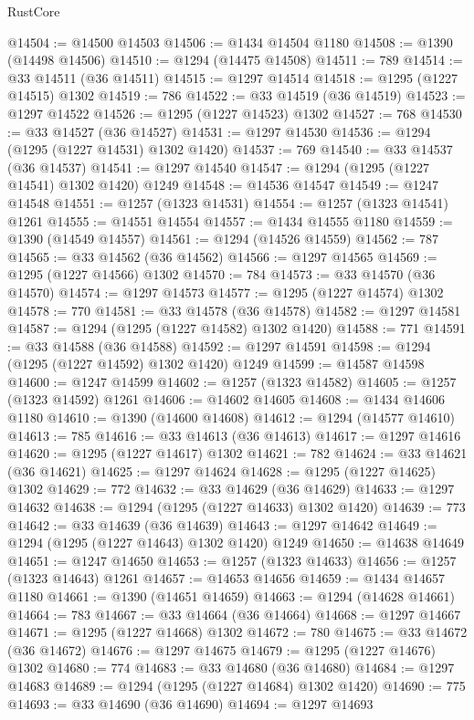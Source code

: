 \begin{lexlean}{RustCore}
\begin{coremodule}
@14504 := @14500 @14503
@14506 := @1434 @14504 @1180
@14508 := @1390 (@14498 @14506)
@14510 := @1294 (@14475 @14508)
@14511 := 789
@14514 := @33 @14511 (@36 @14511)
@14515 := @1297 @14514
@14518 := @1295 (@1227 @14515) @1302
@14519 := 786
@14522 := @33 @14519 (@36 @14519)
@14523 := @1297 @14522
@14526 := @1295 (@1227 @14523) @1302
@14527 := 768
@14530 := @33 @14527 (@36 @14527)
@14531 := @1297 @14530
@14536 := @1294 (@1295 (@1227 @14531) @1302 @1420)
@14537 := 769
@14540 := @33 @14537 (@36 @14537)
@14541 := @1297 @14540
@14547 := @1294 (@1295 (@1227 @14541) @1302 @1420) @1249
@14548 := @14536 @14547
@14549 := @1247 @14548
@14551 := @1257 (@1323 @14531)
@14554 := @1257 (@1323 @14541) @1261
@14555 := @14551 @14554
@14557 := @1434 @14555 @1180
@14559 := @1390 (@14549 @14557)
@14561 := @1294 (@14526 @14559)
@14562 := 787
@14565 := @33 @14562 (@36 @14562)
@14566 := @1297 @14565
@14569 := @1295 (@1227 @14566) @1302
@14570 := 784
@14573 := @33 @14570 (@36 @14570)
@14574 := @1297 @14573
@14577 := @1295 (@1227 @14574) @1302
@14578 := 770
@14581 := @33 @14578 (@36 @14578)
@14582 := @1297 @14581
@14587 := @1294 (@1295 (@1227 @14582) @1302 @1420)
@14588 := 771
@14591 := @33 @14588 (@36 @14588)
@14592 := @1297 @14591
@14598 := @1294 (@1295 (@1227 @14592) @1302 @1420) @1249
@14599 := @14587 @14598
@14600 := @1247 @14599
@14602 := @1257 (@1323 @14582)
@14605 := @1257 (@1323 @14592) @1261
@14606 := @14602 @14605
@14608 := @1434 @14606 @1180
@14610 := @1390 (@14600 @14608)
@14612 := @1294 (@14577 @14610)
@14613 := 785
@14616 := @33 @14613 (@36 @14613)
@14617 := @1297 @14616
@14620 := @1295 (@1227 @14617) @1302
@14621 := 782
@14624 := @33 @14621 (@36 @14621)
@14625 := @1297 @14624
@14628 := @1295 (@1227 @14625) @1302
@14629 := 772
@14632 := @33 @14629 (@36 @14629)
@14633 := @1297 @14632
@14638 := @1294 (@1295 (@1227 @14633) @1302 @1420)
@14639 := 773
@14642 := @33 @14639 (@36 @14639)
@14643 := @1297 @14642
@14649 := @1294 (@1295 (@1227 @14643) @1302 @1420) @1249
@14650 := @14638 @14649
@14651 := @1247 @14650
@14653 := @1257 (@1323 @14633)
@14656 := @1257 (@1323 @14643) @1261
@14657 := @14653 @14656
@14659 := @1434 @14657 @1180
@14661 := @1390 (@14651 @14659)
@14663 := @1294 (@14628 @14661)
@14664 := 783
@14667 := @33 @14664 (@36 @14664)
@14668 := @1297 @14667
@14671 := @1295 (@1227 @14668) @1302
@14672 := 780
@14675 := @33 @14672 (@36 @14672)
@14676 := @1297 @14675
@14679 := @1295 (@1227 @14676) @1302
@14680 := 774
@14683 := @33 @14680 (@36 @14680)
@14684 := @1297 @14683
@14689 := @1294 (@1295 (@1227 @14684) @1302 @1420)
@14690 := 775
@14693 := @33 @14690 (@36 @14690)
@14694 := @1297 @14693

\end{coremodule}
\end{lexlean}
